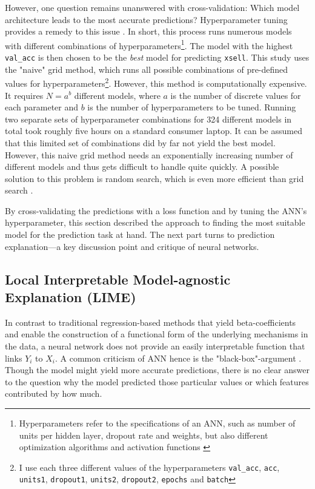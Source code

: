 \documentclass[12pt,a4paper]{article}
\let\code=\texttt
\begin{document}
However, one question remains unanswered with cross-validation: Which model architecture leads to the most accurate predictions?
Hyperparameter tuning provides a remedy to this issue \citep{bergstraRandomSearchHyperparameter2012}.
In short, this process runs numerous models with different combinations of hyperparameters\footnote{Hyperparameters refer to the specifications of an ANN,
such as number of units per hidden layer, dropout rate and weights, but also different optimization algorithms and activation functions \citep{bengioGradientbasedOptimizationHyperparameters2000}}. 
The model with the highest \code{val\_acc} is then chosen to be the \textit{best} model for predicting \code{xsell}.
This study uses the "naive" grid method, which runs all possible combinations of pre-defined values for hyperparameters\footnote{I use each three different values of the hyperparameters \code{val\_acc}, \code{acc}, \code{units1}, \code{dropout1}, \code{units2}, \code{dropout2}, \code{epochs} and \code{batch}}.
However, this method is computationally expensive.
It requires $N=a^b$ different models, where $a$ is the number of discrete values for each parameter and $b$ is the 
number of hyperparameters to be tuned.
Running two separate sets of hyperparameter combinations for 324 different models in total took roughly five hours on a standard consumer laptop.
It can be assumed that this limited set of combinations did by far not yield the best model.
However, this naive grid method needs an exponentially increasing number of different models and thus gets difficult to handle quite quickly.
A possible solution to this problem is random search, which is even more efficient than grid search \citep{bergstraRandomSearchHyperparameter2012}.

By cross-validating the predictions with a loss function and by tuning the ANN's hyperparameter, 
this section described the approach to finding the most suitable model for the prediction task at hand.
The next part turns to prediction explanation---a key discussion point and critique of neural networks.

\subsection{Local Interpretable Model-agnostic Explanation (LIME)} \label{sec_lime_theory}
In contrast to traditional regression-based methods that yield beta-coefficients and enable the construction of a functional form of 
the underlying mechanisms in the data, a neural network does not provide an easily interpretable function that links $Y_i$ to $X_i$.
A common criticism of ANN hence is the "black-box"-argument \citep{benitezAreArtificialNeural1997, dayhoffArtificialNeuralNetworks2001}.
Though the model might yield more accurate predictions, there is no clear answer to the question why the model predicted those particular values
or which features contributed by how much.
\end{document}

